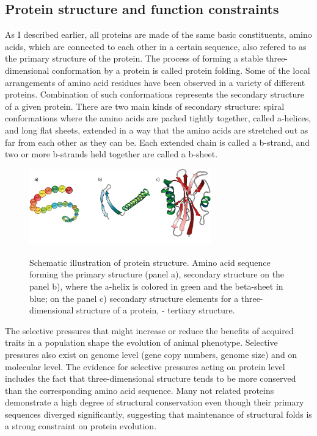 \documentclass[11pt, a4paper,oneside]{report}
\begin{document}
\subsection{Protein structure and function constraints}
As I described earlier,  all proteins are made of the
same basic constituents, amino acids, which are connected to each other in a certain sequence, also refered to as the primary structure of the protein. The process of forming a stable three-dimensional conformation by a protein is called protein folding. 
 Some of the local arrangements of amino acid residues have been observed in a variety of different proteins.  Combination of such conformations represents the secondary structure of a given protein.  There are two main kinds of secondary structure: spiral conformations where the amino acids are packed tightly together, called a-helices, and long flat sheets, extended in a way that the amino acids are stretched out as far from each other as they can be. Each extended chain is called a b-strand, and two or more b-strands held together are called a b-sheet.

\begin{figure}[ht]
\begin{center}
\label{img:populations}
\includegraphics[width=0.7\textwidth]{figures/protein_structure.png}
\end{center}
\caption{Schematic illustration of protein structure. Amino acid sequence forming the primary structure (panel a), secondary structure on the panel b), where the a-helix is colored in green and the beta-sheet in blue; on the panel c) secondary structure elements for a three-dimensional structure of a protein, - tertiary structure.} 
\end{figure}

The selective pressures that might increase or reduce the benefits of acquired traits in a population shape the evolution of animal phenotype. Selective pressures also exist on genome level (gene copy numbers, genome size) and on molecular level. The evidence for selective pressures acting on protein level includes the fact that three-dimensional structure tends to be more conserved than the corresponding amino acid sequence\cite{Illergard2009}.  Many not related proteins demonstrate a high degree of structural conservation even though their primary sequences diverged significantly, suggesting that maintenance of structural folds is a strong constraint on protein evolution\cite{Sousounis2012}. 
\end{document}
